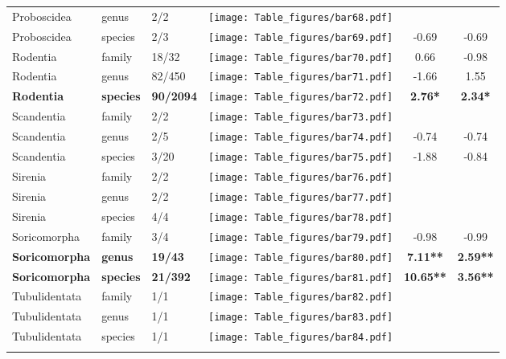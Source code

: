 \begin{longtable}{lL{1.8cm}C{2cm}lcc}
  Proboscidea & genus & 2/2 & \texttt{[image: Table\_figures/bar68.pdf]} &   &   \\ 
  Proboscidea & species & 2/3 & \texttt{[image: Table\_figures/bar69.pdf]} & -0.69 & -0.69 \\ 
  Rodentia & family & 18/32 & \texttt{[image: Table\_figures/bar70.pdf]} & 0.66 & -0.98 \\ 
  Rodentia & genus & 82/450 & \texttt{[image: Table\_figures/bar71.pdf]} & -1.66 & 1.55 \\ 
  \textbf{Rodentia} & \textbf{species} & \textbf{90/2094} & \texttt{[image: Table\_figures/bar72.pdf]} & \textbf{2.76*} & \textbf{2.34*} \\ 
  Scandentia & family & 2/2 & \texttt{[image: Table\_figures/bar73.pdf]} &   &   \\ 
  Scandentia & genus & 2/5 & \texttt{[image: Table\_figures/bar74.pdf]} & -0.74 & -0.74 \\ 
  Scandentia & species & 3/20 & \texttt{[image: Table\_figures/bar75.pdf]} & -1.88 & -0.84 \\ 
  Sirenia & family & 2/2 & \texttt{[image: Table\_figures/bar76.pdf]} &   &   \\ 
  Sirenia & genus & 2/2 & \texttt{[image: Table\_figures/bar77.pdf]} &   &   \\ 
  Sirenia & species & 4/4 & \texttt{[image: Table\_figures/bar78.pdf]} &   &   \\ 
  Soricomorpha & family & 3/4 & \texttt{[image: Table\_figures/bar79.pdf]} & -0.98 & -0.99 \\ 
  \textbf{Soricomorpha} & \textbf{genus} & \textbf{19/43} & \texttt{[image: Table\_figures/bar80.pdf]} & \textbf{7.11**} & \textbf{2.59**} \\ 
  \textbf{Soricomorpha} & \textbf{species} & \textbf{21/392} & \texttt{[image: Table\_figures/bar81.pdf]} & \textbf{10.65**} & \textbf{3.56**} \\ 
  Tubulidentata & family & 1/1 & \texttt{[image: Table\_figures/bar82.pdf]} &   &   \\ 
  Tubulidentata & genus & 1/1 & \texttt{[image: Table\_figures/bar83.pdf]} &   &   \\ 
  Tubulidentata & species & 1/1 & \texttt{[image: Table\_figures/bar84.pdf]} &   &   \\ 
   \hline
\hline
\label{Table_results}
\end{longtable}
